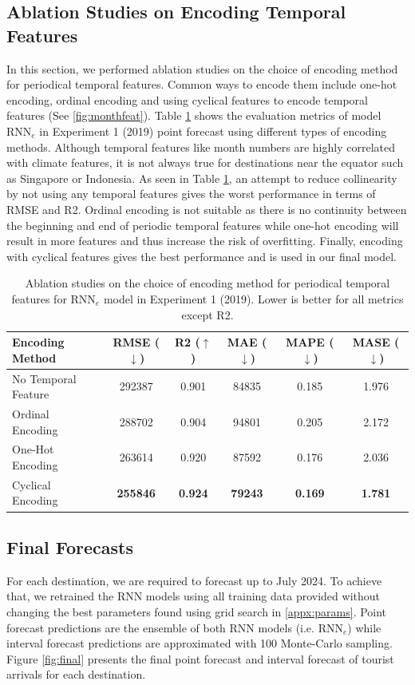 \documentclass{article}
\begin{document}
\subsection{Ablation Studies on Encoding Temporal Features}
\label{appx:ablation}
In this section, we performed ablation studies on the choice of encoding method for periodical temporal features. Common ways to encode them include one-hot encoding, ordinal encoding and using cyclical features to encode temporal features (See \ref{fig:monthfeat}). Table \ref{table:ablation} shows the evaluation metrics of model RNN$_e$ in Experiment 1 (2019) point forecast using different types of encoding methods. Although temporal features like month numbers are highly correlated with climate features, it is not always true for destinations near the equator such as Singapore or Indonesia. As seen in Table \ref{table:ablation}, an attempt to reduce collinearity by not using any temporal features gives the worst performance in terms of RMSE and R2. Ordinal encoding is not suitable as there is no continuity between the beginning and end of periodic temporal features while one-hot encoding will result in more features and thus increase the risk of overfitting. Finally, encoding with cyclical features gives the best performance and is used in our final model.

\begin{table}[htbp]
\small
    \centering
        \begin{tabular}{l|ccccc}
            Encoding Method & RMSE ($\downarrow$) & R2 ($\uparrow$) & MAE ($\downarrow$) & MAPE ($\downarrow$) & MASE ($\downarrow$) \\
            \hline
            No Temporal Feature & 292387 & 0.901 & 84835 & 0.185 & 1.976 \\
            Ordinal Encoding & 288702 & 0.904 & 94801 & 0.205 & 2.172 \\
            One-Hot Encoding & 263614 & 0.920 & 87592 & 0.176 & 2.036 \\
            Cyclical Encoding & \textbf{255846} & \textbf{0.924} & \textbf{79243} & \textbf{0.169} & \textbf{1.781} \\
        \end{tabular}
    \caption{Ablation studies on the choice of encoding method for periodical temporal features for RNN$_e$ model in Experiment 1 (2019). Lower is better for all metrics except R2.}
    \label{table:ablation}
\end{table}

\subsection{Final Forecasts}
\label{appx:final}
For each destination, we are required to forecast up to July 2024. To achieve that, we retrained the RNN models using all training data provided without changing the best parameters found using grid search in \ref{appx:params}. Point forecast predictions are the ensemble of both RNN models (i.e. RNN$_e$) while interval forecast predictions are approximated with 100 Monte-Carlo sampling. Figure \ref{fig:final} presents the final point forecast and interval forecast of tourist arrivals for each destination.
\end{document}
